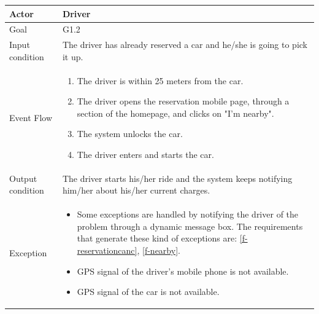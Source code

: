 \begin{table}[H]
	\begin{center}
		\begin{tabular}{| l | p{} |}
			\hline
			Actor & Driver \\
			\hline
			Goal & G1.2
			\\
			\hline
			Input condition & The driver has already reserved a car and he/she is going to pick it up.  \\
			\hline
			Event Flow & \begin{enumerate}
				\item The driver is within 25 meters from the car.
				\item The driver opens the reservation mobile page, through a section of the homepage, and clicks on "I'm nearby".
				\item The system unlocks the car.
				\item The driver enters and starts the car. 
			\end{enumerate}
			\\
			\hline
			Output condition & The driver starts his/her ride and the system keeps notifying him/her about his/her current charges. \\
			\hline
			
			Exception &  \begin{itemize}
				\item Some exceptions are handled by notifying the driver of the problem through a dynamic message box.				
				The requirements that generate these kind of exceptions are:
				\ref{f-reservationcanc},    %
				\ref{f-nearby}.    %
				\item GPS signal of the driver's mobile phone is not available.
				\item GPS signal of the car is not available.		
			\end{itemize}
			\\
			\hline
		\end{tabular}
	\end{center}
\end{table}

